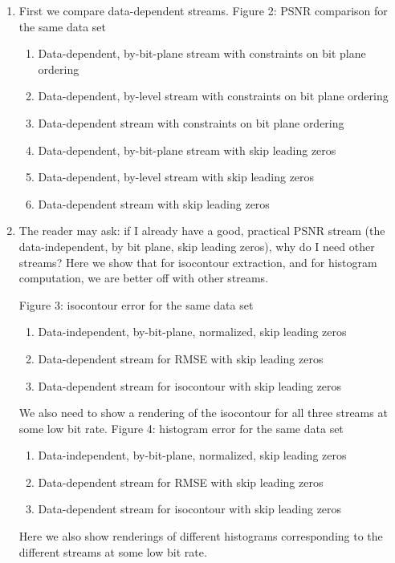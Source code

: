 \begin{enumerate}
    \item First we compare data-dependent streams. Figure 2: PSNR comparison for the same data set
  \begin{enumerate}
    \item Data-dependent, by-bit-plane stream with constraints on bit plane ordering
    \item Data-dependent, by-level stream with constraints on bit plane ordering
    \item Data-dependent stream with constraints on bit plane ordering
    \item Data-dependent, by-bit-plane stream with skip leading zeros
    \item Data-dependent, by-level stream with skip leading zeros
    \item Data-dependent stream with skip leading zeros
  \end{enumerate}

  \item The reader may ask: if I already have a good, practical PSNR stream (the data-independent, by bit plane, skip leading zeros), why do I need other streams? Here we show that for isocontour extraction, and for histogram computation, we are better off with other streams.
  
  Figure 3: isocontour error for the same data set
    \begin{enumerate}
      \item Data-independent, by-bit-plane, normalized, skip leading zeros
      \item Data-dependent stream for RMSE with skip leading zeros
      \item Data-dependent stream for isocontour with skip leading zeros
    \end{enumerate}
  We also need to show a rendering of the isocontour for all three streams at some low bit rate.
  Figure 4: histogram error for the same data set
    \begin{enumerate}
      \item Data-independent, by-bit-plane, normalized, skip leading zeros
      \item Data-dependent stream for RMSE with skip leading zeros
      \item Data-dependent stream for isocontour with skip leading zeros
  \end{enumerate}  
  Here we also show renderings of different histograms corresponding to the different streams at some low bit rate.
\end{enumerate}
